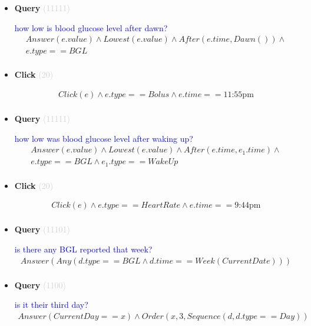 \documentclass[11pt]{article}
\newcommand{\key}[1]{\textcolor{lightgray}{#1}}
\newcounter{CQuery}
\newcounter{CClick}
\begin{document}
\begin{itemize}
\item
\textbf{Query\theCQuery} \key{(11111)} \addtocounter{CQuery}{1}
\textcolor{blue}{ how low is blood glucose level after dawn? }
\begin{multline*}
Answer(e.value) \wedge Lowest(e.value) \wedge After(e.time, Dawn()) \wedge \\ 
e.type==BGL \\ 
\end{multline*}


\item
\textbf{Click\theCClick} \key{(20)} \addtocounter{CClick}{1}
\textcolor{blue}{  }
\begin{multline*}
Click(e) \wedge e.type==Bolus \wedge e.time==\mbox{11:55pm} \\ 
\end{multline*}


\item
\textbf{Query\theCQuery} \key{(11111)} \addtocounter{CQuery}{1}
\textcolor{blue}{ how low was blood glucose level after waking up? }
\begin{multline*}
Answer(e.value) \wedge Lowest(e.value) \wedge After(e.time, e_1.time) \wedge \\ 
e.type==BGL \wedge e_1.type==WakeUp \\ 
\end{multline*}


\item
\textbf{Click\theCClick} \key{(20)} \addtocounter{CClick}{1}
\textcolor{blue}{  }
\begin{multline*}
Click(e) \wedge e.type==HeartRate \wedge e.time==\mbox{9:44pm} \\ 
\end{multline*}


\item
\textbf{Query\theCQuery} \key{(11101)} \addtocounter{CQuery}{1}
\textcolor{blue}{ is there any BGL reported that week? }
\begin{multline*}
Answer(Any(d.type==BGL \wedge d.time==Week(CurrentDate))) \\ 
\end{multline*}


\item
\textbf{Query\theCQuery} \key{(1100)} \addtocounter{CQuery}{1}
\textcolor{blue}{ is it their third day? }
\begin{multline*}
Answer(CurrentDay==x) \wedge Order(x, 3, Sequence(d, d.type==Day)) \\ 
\end{multline*}



\end{itemize}
\end{document}
